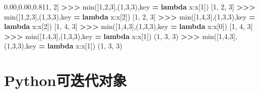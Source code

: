 \documentclass[]{ctexbook}
\newenvironment{Shaded}{\begin{snugshade}}{\end{snugshade}}
\newcommand{\BuiltInTok}[1]{#1}
\newcommand{\DecValTok}[1]{\textcolor[rgb]{0.00,0.00,0.81}{#1}}
\newcommand{\KeywordTok}[1]{\textcolor[rgb]{0.13,0.29,0.53}{\textbf{#1}}}
\newcommand{\NormalTok}[1]{#1}
\newcommand{\OperatorTok}[1]{\textcolor[rgb]{0.81,0.36,0.00}{\textbf{#1}}}
\begin{document}
\begin{Shaded}
\begin{Highlighting}[]
\NormalTok{[}\DecValTok{1}\NormalTok{, }\DecValTok{2}\NormalTok{]}
\OperatorTok{>>>} \BuiltInTok{min}\NormalTok{([}\DecValTok{1}\NormalTok{,}\DecValTok{2}\NormalTok{,}\DecValTok{3}\NormalTok{],(}\DecValTok{1}\NormalTok{,}\DecValTok{3}\NormalTok{,}\DecValTok{3}\NormalTok{),key }\OperatorTok{=} \KeywordTok{lambda}\NormalTok{ x:x[}\DecValTok{1}\NormalTok{])}
\NormalTok{[}\DecValTok{1}\NormalTok{, }\DecValTok{2}\NormalTok{, }\DecValTok{3}\NormalTok{]}
\OperatorTok{>>>} \BuiltInTok{min}\NormalTok{([}\DecValTok{1}\NormalTok{,}\DecValTok{2}\NormalTok{,}\DecValTok{3}\NormalTok{],(}\DecValTok{1}\NormalTok{,}\DecValTok{3}\NormalTok{,}\DecValTok{3}\NormalTok{),key }\OperatorTok{=} \KeywordTok{lambda}\NormalTok{ x:x[}\DecValTok{2}\NormalTok{])}
\NormalTok{[}\DecValTok{1}\NormalTok{, }\DecValTok{2}\NormalTok{, }\DecValTok{3}\NormalTok{]}
\OperatorTok{>>>} \BuiltInTok{min}\NormalTok{([}\DecValTok{1}\NormalTok{,}\DecValTok{4}\NormalTok{,}\DecValTok{3}\NormalTok{],(}\DecValTok{1}\NormalTok{,}\DecValTok{3}\NormalTok{,}\DecValTok{3}\NormalTok{),key }\OperatorTok{=} \KeywordTok{lambda}\NormalTok{ x:x[}\DecValTok{2}\NormalTok{])}
\NormalTok{[}\DecValTok{1}\NormalTok{, }\DecValTok{4}\NormalTok{, }\DecValTok{3}\NormalTok{]}
\OperatorTok{>>>} \BuiltInTok{min}\NormalTok{([}\DecValTok{1}\NormalTok{,}\DecValTok{4}\NormalTok{,}\DecValTok{3}\NormalTok{],(}\DecValTok{1}\NormalTok{,}\DecValTok{3}\NormalTok{,}\DecValTok{3}\NormalTok{),key }\OperatorTok{=} \KeywordTok{lambda}\NormalTok{ x:x[}\DecValTok{0}\NormalTok{])}
\NormalTok{[}\DecValTok{1}\NormalTok{, }\DecValTok{4}\NormalTok{, }\DecValTok{3}\NormalTok{]}
\OperatorTok{>>>} \BuiltInTok{min}\NormalTok{([}\DecValTok{1}\NormalTok{,}\DecValTok{4}\NormalTok{,}\DecValTok{3}\NormalTok{],(}\DecValTok{1}\NormalTok{,}\DecValTok{3}\NormalTok{,}\DecValTok{3}\NormalTok{),key }\OperatorTok{=} \KeywordTok{lambda}\NormalTok{ x:x[}\DecValTok{1}\NormalTok{])}
\NormalTok{(}\DecValTok{1}\NormalTok{, }\DecValTok{3}\NormalTok{, }\DecValTok{3}\NormalTok{)}
\OperatorTok{>>>} \BuiltInTok{min}\NormalTok{([}\DecValTok{1}\NormalTok{,}\DecValTok{4}\NormalTok{,}\DecValTok{3}\NormalTok{],(}\DecValTok{1}\NormalTok{,}\DecValTok{3}\NormalTok{,}\DecValTok{3}\NormalTok{),key }\OperatorTok{=} \KeywordTok{lambda}\NormalTok{ x:x[}\DecValTok{1}\NormalTok{])}
\NormalTok{(}\DecValTok{1}\NormalTok{, }\DecValTok{3}\NormalTok{, }\DecValTok{3}\NormalTok{)}
\end{Highlighting}
\end{Shaded}

\hypertarget{iterator}{%
\chapter{Python可迭代对象}\label{iterator}}
\end{document}

